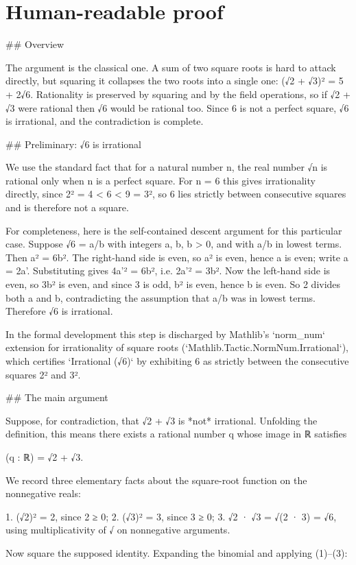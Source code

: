 \documentclass[11pt]{article}
\begin{document}
\section*{Human-readable proof}
\#\# Overview

The argument is the classical one. A sum of two square roots is hard to attack directly, but squaring it collapses the two roots into a single one: (√2 + √3)² = 5 + 2√6. Rationality is preserved by squaring and by the field operations, so if √2 + √3 were rational then √6 would be rational too. Since 6 is not a perfect square, √6 is irrational, and the contradiction is complete.

\#\# Preliminary: √6 is irrational

We use the standard fact that for a natural number n, the real number √n is rational only when n is a perfect square. For n = 6 this gives irrationality directly, since 2² = 4 < 6 < 9 = 3², so 6 lies strictly between consecutive squares and is therefore not a square.

For completeness, here is the self-contained descent argument for this particular case. Suppose √6 = a/b with integers a, b, b > 0, and with a/b in lowest terms. Then a² = 6b². The right-hand side is even, so a² is even, hence a is even; write a = 2a'. Substituting gives 4a'² = 6b², i.e. 2a'² = 3b². Now the left-hand side is even, so 3b² is even, and since 3 is odd, b² is even, hence b is even. So 2 divides both a and b, contradicting the assumption that a/b was in lowest terms. Therefore √6 is irrational.

In the formal development this step is discharged by Mathlib's `norm\_num` extension for irrationality of square roots (`Mathlib.Tactic.NormNum.Irrational`), which certifies `Irrational (√6)` by exhibiting 6 as strictly between the consecutive squares 2² and 3².

\#\# The main argument

Suppose, for contradiction, that √2 + √3 is *not* irrational. Unfolding the definition, this means there exists a rational number q whose image in ℝ satisfies

    (q : ℝ) = √2 + √3.

We record three elementary facts about the square-root function on the nonnegative reals:

1. (√2)² = 2, since 2 ≥ 0;
2. (√3)² = 3, since 3 ≥ 0;
3. √2 · √3 = √(2 · 3) = √6, using multiplicativity of √ on nonnegative arguments.

Now square the supposed identity. Expanding the binomial and applying (1)–(3):
\end{document}
